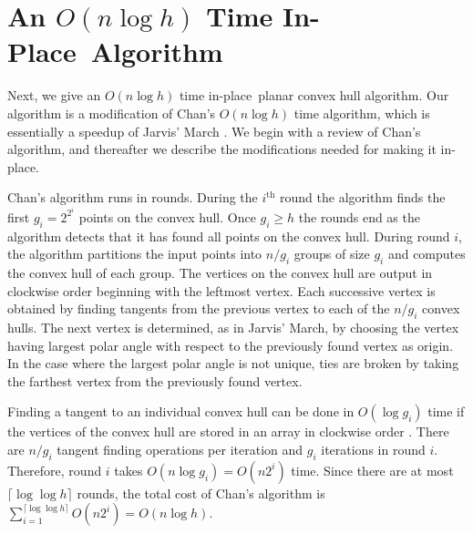 \documentclass{elsart}
\newcommand{\inplace}{in-place}
\newcommand{\InPlace}{In-Place}
\begin{document}
\section{An $O(n\log h)$ Time \InPlace\ Algorithm}

Next, we give an $O(n\log h)$ time \inplace\ planar convex hull
algorithm.  Our algorithm is a modification of Chan's $O(n\log h)$
time algorithm, which is essentially a speedup of Jarvis' March
\cite{j73}.  We begin with a review of Chan's algorithm, and
thereafter we describe the modifications needed for making it
\inplace.

Chan's algorithm runs in rounds.  During the $i^\mathrm{th}$ round the
algorithm finds the first $g_i=2^{2^i}$ points on the convex hull.
Once $g_i\ge h$ the rounds end as the algorithm detects that it has
found all points on the convex hull.  During round $i$, the algorithm
partitions the input points into $n/g_i$ groups of size $g_i$ and
computes the convex hull of each group.  The vertices on the convex
hull are output in clockwise order beginning with the leftmost vertex.
Each successive vertex is obtained by finding tangents from the
previous vertex to each of the $n/g_i$ convex hulls.  The next vertex
is determined, as in Jarvis' March, by choosing the vertex having
largest polar angle with respect to the previously found vertex as
origin.  In the case where the largest polar angle is not unique, ties
are broken by taking the farthest vertex from the previously found
vertex.

Finding a tangent to an individual convex hull can be done in $O(\log
g_i)$ time if the vertices of the convex hull are stored in an array
in clockwise order \cite{cd87,ps85,ov81}.  There are $n/g_i$ tangent
finding operations per iteration and $g_i$ iterations in round $i$.
Therefore, round $i$ takes $O(n\log g_i)=O(n2^i)$ time.  Since there
are at most $\lceil \log\log h \rceil$ rounds, the total cost of
Chan's algorithm is $\sum_{i=1}^{\lceil \log\log h \rceil} O(n2^i) =
O(n\log h)$.
\end{document}
